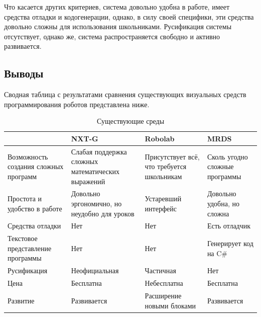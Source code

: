 \documentclass[a4paper]{article}
\begin{document}
Что касается других критериев, система довольно удобна в работе, имеет средства отладки и кодогенерации, однако, в силу своей специфики, эти средства довольно сложны для использования школьниками. Русификация системы отсутствует, однако же, система распространяется свободно и активно развивается.

\subsection{Выводы}
Сводная таблица с результатами сравнения существующих визуальных средств программирования роботов представлена ниже.

\begin{table}[h]
  \centering
    \begin{tabular} {| p{} | p{} | p{} | p{} |}
      \hline
                                            & NXT-G                                             & Robolab                                    & MRDS \\
      \hline
      Возможность создания сложных программ & Слабая поддержка сложных математических выражений & Присутствует всё, что требуется школьникам & Сколь угодно сложные программы \\
      \hline
      Простота и удобство в работе          & Довольно эргономично, но неудобно для уроков      & Устаревший интерфейс                       & Довольно удобна, но сложна \\
      \hline
      Средства отладки                      & Нет                                               & Нет                                        & Есть отладчик \\
      \hline
      Текстовое представление программы     & Нет                                               & Нет                                        & Генерирует код на C\# \\
      \hline
      Русификация                           & Неофициальная                                     & Частичная                                  & Нет \\
      \hline
      Цена                                  & Бесплатна                                         & Небесплатна                                & Бесплатна \\
      \hline
      Развитие                              & Развивается                                       & Расширение новыми блоками                  & Развивается \\
      \hline
    \end{tabular}
  \caption{Существующие среды}
  \label{tab:existingTools}
\end{table}
\end{document}
